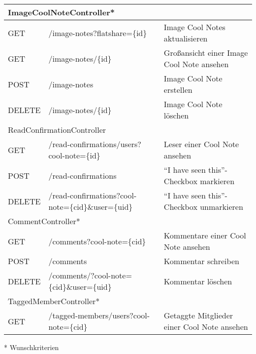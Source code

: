 \documentclass[a4paper]{scrreprt}
\begin{document}
\begin{flushleft}
\begin{longtable}{|p{}|p{}|p{}|}
		\hline
		\multicolumn{3}{|l|}{ImageCoolNoteController*} \\
		\hline
		GET & /image-notes?flatshare=\{id\} & Image Cool Notes aktualisieren \\
		GET & /image-notes/\{id\} & Großansicht einer Image Cool Note ansehen \\
		POST & /image-notes & Image Cool Note erstellen \\
		DELETE & /image-notes/\{id\} & Image Cool Note löschen \\
		\hline	
		\multicolumn{3}{|l|}{ReadConfirmationController} \\
		\hline
		GET & /read-confirmations/users?cool-note=\{id\} & Leser einer Cool Note ansehen \\
		POST & /read-confirmations & ``I have seen this''-Checkbox markieren \\
		DELETE & /read-confirmations?cool-note=\{cid\}\&user=\{uid\} & ``I have seen this''-Checkbox unmarkieren \\
		\hline
		\multicolumn{3}{|l|}{CommentController*} \\
		\hline
		GET & /comments?cool-note=\{cid\} & Kommentare einer Cool Note ansehen \\
		POST & /comments & Kommentar schreiben \\
		DELETE & /comments/?cool-note=\{cid\}\&user=\{uid\} & Kommentar löschen \\
		\hline
		\multicolumn{3}{|l|}{TaggedMemberController*} \\
		\hline
		GET & /tagged-members/users?cool-note=\{cid\} & Getaggte Mitglieder einer Cool Note ansehen \\
		\hline
		\end{longtable}
	\end{flushleft}
	* Wunschkriterien
	
	\newpage
\end{document}
